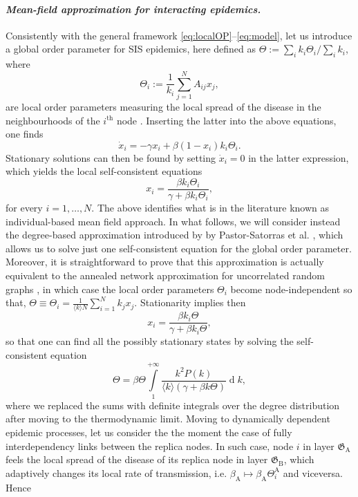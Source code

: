 \documentclass[pre,twocolumn,superscriptaddress]{revtex4}
\DeclareMathOperator{\dd}{\mathrm{d}}
\newcommand{\1}{\mathds{1}}
\begin{document}
{{\paragraph*{\textbf{{\em{\small Mean-field approximation for interacting epidemics.}}}} 
Consistently with the general framework \eqref{eq:localOP}--\eqref{eq:model}, let us introduce a global order parameter for SIS epidemics, here defined as $\Theta:=\sum_{i} k_i\Theta_i/\sum_i k_i$, where
$$
\Theta_i:=\frac{1}{k_i}\sum_{j=1}^N A_{ij}x_j,
$$
are local order parameters measuring the local spread of the disease in the neighbourhoods of the $i^{\mathrm{th}}$ node \cite{barrat-book2008,newman-book2010,pastorsatorras-revmodphys2015}. Inserting the latter into the above equations, one finds 
$$
\dot{x}_i=-\gamma x_i+\beta(1-x_i)k_i\Theta_i.
$$
Stationary solutions can then be found by setting $\dot{x}_i=0$ in the latter expression, which yields the local self-consistent equations
$$
x_i=\frac{\beta k_i \Theta_i}{\gamma+\beta k_i\Theta_i},
$$
for every $i=1,\dots,N$. The above identifies what is in the literature known as individual-based mean field approach. In what follows, we will consider instead the degree-based approximation introduced by by Pastor-Satorras et {al.} \cite{pastorsatorras-prl2001,pastorsatorras-revmodphys2015}, which allows us to solve just one self-consistent equation for the global order parameter. Moreover, it is straightforward to prove that this approximation is actually equivalent to the annealed network approximation for uncorrelated random graphs \cite{newman-book2010,pastorsatorras-revmodphys2015}, in which case the local order parameters $\Theta_i$ become node-independent so that, $\Theta\equiv\Theta_i=\frac{1}{\langle k\rangle N}\sum_{i=1}^N k_jx_j$. Stationarity implies then 
$$
x_i=\frac{\beta k_i\Theta}{\gamma +\beta k_i\Theta},
$$
so that one can find all the possibly stationary states by solving the self-consistent equation 
\begin{displaymath}
\Theta=\beta\Theta\int\limits_1^{+\infty}
\frac{k^2 P(k)}{\langle k\rangle\left(\gamma+\beta k\Theta\right)}\dd k,
\end{displaymath}
where we replaced the sums with definite integrals over the degree distribution after moving to the thermodynamic limit. 
Moving to dynamically dependent epidemic processes, let us consider the the moment the case of fully interdependency links between the replica nodes. In such case, node $i$ in layer $\mathfrak{G}_\mathrm{A}$ feels the local spread of the disease of its replica node in layer $\mathfrak{G}_\mathrm{B}$, which adaptively changes its local rate of transmission, i.e. $\beta_\mathrm{A}\mapsto\beta_\mathrm{A}\Theta_i^{\mathrm{A}}$ and viceversa. Hence 
}}
\end{document}
